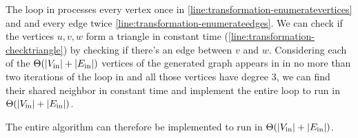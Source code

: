 The loop in  processes every vertex once in \cref{line:transformation-enumeratevertices} and and every edge twice \cref{line:transformation-enumerateedges}. We can check if the vertices $u,v,w$ form a triangle in constant time (\cref{line:transformation-checktriangle}) by checking if there's an edge between $v$ and $w$. Considering each of the $\Theta(\left\lvert V_\text{in}\right\rvert + \left\lvert E_\text{in}\right\rvert)$ vertices of the generated graph appears in  in no more than two iterations of the loop in  and all those vertices have degree 3, we can find their shared neighbor in constant time and implement the entire loop to run in $\Theta(\left\lvert V_\text{in}\right\rvert + \left\lvert E_\text{in}\right\rvert)$.


The entire algorithm can therefore be implemented to run in $\Theta(\left\lvert V_\text{in}\right\rvert + \left\lvert E_\text{in}\right\rvert)$.
